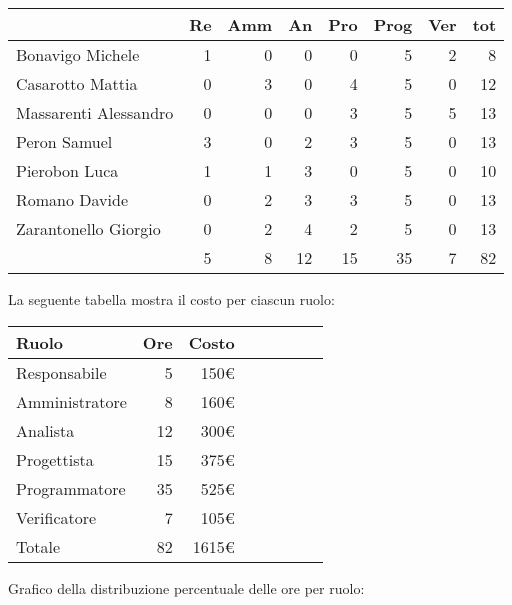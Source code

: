 \begin{table}[ht]
    \begin{tabularx}{\linewidth}{X|rrrrrrr}
    \rowcolor{gray!30}& Re & Amm & An & Pro & Prog & Ver & tot \\
    \hline
    Bonavigo Michele                        & 1 & 0 & 0 & 0 & 5 & 2 & 8 \\
    \rowcolor{gray!10}Casarotto Mattia      & 0 & 3 & 0 & 4 & 5 & 0 & 12 \\
    Massarenti Alessandro                   & 0 & 0 & 0 & 3 & 5 & 5 & 13 \\
    \rowcolor{gray!10}Peron Samuel          & 3 & 0 & 2 & 3 & 5 & 0 & 13 \\
    Pierobon Luca                           & 1 & 1 & 3 & 0 & 5 & 0 & 10 \\
    \rowcolor{gray!10}Romano Davide         & 0 & 2 & 3 & 3 & 5 & 0 & 13 \\
    Zarantonello Giorgio                    & 0 & 2 & 4 & 2 & 5 & 0 & 13 \\
    \hline                                  & 5 & 8 & 12 & 15 & 35 & 7 & 82 \\ 
    \end{tabularx}
\end{table}

La seguente tabella mostra il costo per ciascun ruolo:
\begin{table}[ht]
    \begin{tabularx}{\linewidth}{X|rrrrrrr}
    \rowcolor{gray!30}Ruolo & Ore & Costo \\
    \hline
    Responsabile                            & 5  & 150€ \\
    \rowcolor{gray!10}Amministratore        & 8  & 160€ \\
    Analista                                & 12  & 300€ \\
    \rowcolor{gray!10}Progettista           & 15  & 375€ \\
    Programmatore                           & 35  & 525€ \\
    \rowcolor{gray!10}Verificatore          & 7  & 105€ \\
    \hline Totale                           & 82  & 1615€ \\ 
    \end{tabularx}
\end{table}

Grafico della distribuzione percentuale delle ore per ruolo:
\begin{center}
\end{center}

